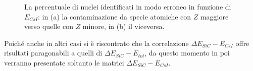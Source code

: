 \begin{figure}[!p] 
	\centering
	\hspace{10mm}
	\caption{La percentuale di nuclei identificati in modo erroneo in funzione di $E_{CsI}$: in (a) la contaminazione da specie atomiche con $Z$ maggiore verso quelle con $Z$ minore, in (b) il viceversa.} \label{fig:leakage_res}
\end{figure}

Poiché anche in altri casi si è riscontrato che la correlazione $\Delta E_{SiC} - E_{CsI}$ offre risultati paragonabili a quelli di $\Delta E_{SiC} - E_{tot}$, da questo momento in poi verranno presentate soltanto le matrici $\Delta E_{SiC} - E_{CsI}$.









